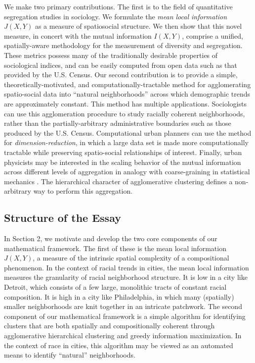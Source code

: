 	We make two primary contributions. The first is to the field of quantitative segregation studies in sociology. We formulate the \emph{mean local information} $J(X,Y)$ as a measure of spatiosocial structure. We then show that this novel measure, in concert with the mutual information $I(X,Y)$, comprise a unified, spatially-aware methodology for the measurement of diversity and segregation. These metrics possess many of the traditionally desirable properties of sociological indices, and can be easily computed from open data such as that provided by the U.S. Census. Our second contribution is to provide a simple, theoretically-motivated, and computationally-tractable method for agglomerating spatio-social data into ``natural neighborhoods'' across which demographic trends are approximately constant. This method has multiple applications. Sociologists can use this agglomeration procedure to study racially coherent neighborhoods, rather than the partially-arbitrary administrative boundaries such as those produced by the U.S. Census. Computational urban planners can use the method for \emph{dimension-reduction}, in which a large data set is made more computationally tractable while preserving spatio-social relationships of interest. Finally, urban physicists may be interested in the scaling behavior of the mutual information across different levels of aggregation in analogy with coarse-graining in statistical mechanics \cite{Bettencourt2015}. The hierarchical character of agglomerative clustering defines a non-arbitrary way to perform this aggregation. 

\subsection{Structure of the Essay}
	In Section 2, we motivate and develop the two core components of our mathematical framework. The first of these is the mean local information $J(X,Y)$, a measure of the intrinsic spatial complexity of a compositional phenomenon. In the context of racial trends in cities, the mean local information measures the granularity of racial neighborhood structure. It is low in a city like Detroit, which consists of a few large, monolithic tracts of constant racial composition. It is high in a city like Philadelphia, in which many (spatially) smaller neighborhoods are knit together in an intricate patchwork. The second component of our mathematical framework is a simple algorithm for identifying clusters that are both spatially and compositionally coherent through agglomerative hierarchical clustering and greedy information maximization. In the context of race in cities, this algorithm may be viewed as an automated means to identify ``natural'' neighborhoods. 

